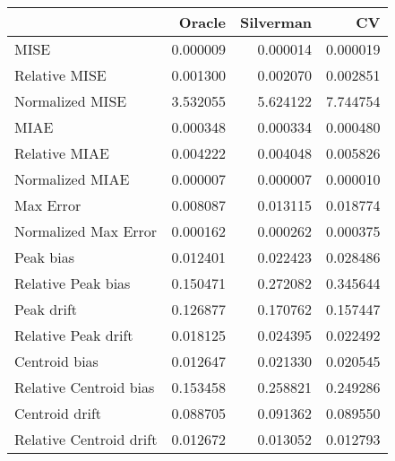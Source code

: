 \begin{tabular}{lrrr}
  \hline
 & Oracle & Silverman & CV \\ 
  \hline
MISE & 0.000009 & 0.000014 & 0.000019 \\ 
  Relative MISE & 0.001300 & 0.002070 & 0.002851 \\ 
  Normalized MISE & 3.532055 & 5.624122 & 7.744754 \\ 
  MIAE & 0.000348 & 0.000334 & 0.000480 \\ 
  Relative MIAE & 0.004222 & 0.004048 & 0.005826 \\ 
  Normalized MIAE & 0.000007 & 0.000007 & 0.000010 \\ 
  Max Error & 0.008087 & 0.013115 & 0.018774 \\ 
  Normalized Max Error & 0.000162 & 0.000262 & 0.000375 \\ 
  Peak bias & 0.012401 & 0.022423 & 0.028486 \\ 
  Relative Peak bias & 0.150471 & 0.272082 & 0.345644 \\ 
  Peak drift & 0.126877 & 0.170762 & 0.157447 \\ 
  Relative Peak drift & 0.018125 & 0.024395 & 0.022492 \\ 
  Centroid bias & 0.012647 & 0.021330 & 0.020545 \\ 
  Relative Centroid bias & 0.153458 & 0.258821 & 0.249286 \\ 
  Centroid drift & 0.088705 & 0.091362 & 0.089550 \\ 
  Relative Centroid drift & 0.012672 & 0.013052 & 0.012793 \\ 
   \hline
\end{tabular}
